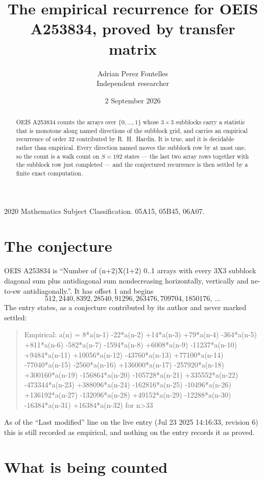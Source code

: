 \documentclass[11pt,a4paper]{article}
\title{The empirical recurrence for OEIS A253834, proved by transfer matrix}
\author{Adrian Perez Fontelles\\ \small Independent researcher}
\date{2 September 2026}
\theoremstyle{plain}
\theoremstyle{definition}
\begin{document}
\maketitle

\begin{abstract}
OEIS A253834 counts the arrays over $\{0,\dots,1\}$ whose $3\times3$ subblocks carry a
statistic that is monotone along named directions of the subblock grid, and carries an
empirical recurrence of order $32$ contributed by R.~H.~Hardin. It is true, and it is
decidable rather than empirical. Every direction named moves the subblock row by at most one,
so the count is a walk count on $S=192$ states --- the last two array rows together with the
subblock row just completed --- and the conjectured recurrence is then settled by a finite
exact computation.
\end{abstract}

\noindent\small 2020 Mathematics Subject Classification. 05A15, 05B45, 06A07.\normalsize

\section{The conjecture}

OEIS A253834 is ``Number of (n+2)X(1+2) 0..1 arrays with every 3X3 subblock diagonal sum plus antidiagonal sum nondecreasing horizontally, vertically and ne-to-sw antidiagonally.''. It has offset $1$ and begins
\[
512, 2440, 8392, 28540, 91296, 263476, 709704, 1850176,\ \dots
\]
The entry states, as a conjecture contributed by its author and never marked settled:
\begin{quote}
Empirical: a(n) = 8*a(n-1) -22*a(n-2) +14*a(n-3) +79*a(n-4) -364*a(n-5) +811*a(n-6) -582*a(n-7) -1594*a(n-8) +6008*a(n-9) -11237*a(n-10) +9484*a(n-11) +10056*a(n-12) -43760*a(n-13) +77100*a(n-14) -77040*a(n-15) -2560*a(n-16) +136000*a(n-17) -257920*a(n-18) +300160*a(n-19) -156864*a(n-20) -105728*a(n-21) +335552*a(n-22) -473344*a(n-23) +388096*a(n-24) -162816*a(n-25) -10496*a(n-26) +136192*a(n-27) -132096*a(n-28) +49152*a(n-29) -12288*a(n-30) -16384*a(n-31) +16384*a(n-32) for n>33
\end{quote}
As of the ``Last modified'' line on the live entry (Jul 23 2025 14:16:33, revision 6) this is still
recorded as empirical, and nothing on the entry records it as proved.

\section{What is being counted}
\end{document}
